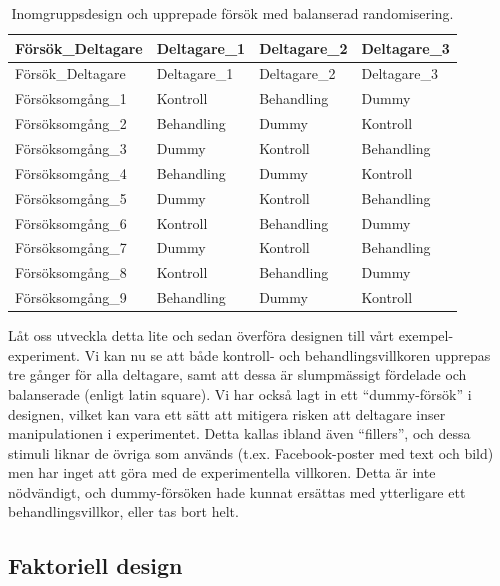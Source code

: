 \documentclass[
]{book}
\begin{document}
\begin{longtable}[]{@{}llll@{}}
\caption{\label{tab:tab-02-07-5-5-02}Inomgruppsdesign och upprepade försök med balanserad randomisering.}\tabularnewline
\toprule
Försök\_Deltagare & Deltagare\_1 & Deltagare\_2 & Deltagare\_3\tabularnewline
\midrule
\endfirsthead
\toprule
Försök\_Deltagare & Deltagare\_1 & Deltagare\_2 & Deltagare\_3\tabularnewline
\midrule
\endhead
Försöksomgång\_1 & Kontroll & Behandling & Dummy\tabularnewline
Försöksomgång\_2 & Behandling & Dummy & Kontroll\tabularnewline
Försöksomgång\_3 & Dummy & Kontroll & Behandling\tabularnewline
Försöksomgång\_4 & Behandling & Dummy & Kontroll\tabularnewline
Försöksomgång\_5 & Dummy & Kontroll & Behandling\tabularnewline
Försöksomgång\_6 & Kontroll & Behandling & Dummy\tabularnewline
Försöksomgång\_7 & Dummy & Kontroll & Behandling\tabularnewline
Försöksomgång\_8 & Kontroll & Behandling & Dummy\tabularnewline
Försöksomgång\_9 & Behandling & Dummy & Kontroll\tabularnewline
\bottomrule
\end{longtable}

Låt oss utveckla detta lite och sedan överföra designen till vårt exempel-experiment. Vi kan nu se att både kontroll- och behandlingsvillkoren upprepas tre gånger för alla deltagare, samt att dessa är slumpmässigt fördelade och balanserade (enligt latin square). Vi har också lagt in ett ``dummy-försök'' i designen, vilket kan vara ett sätt att mitigera risken att deltagare inser manipulationen i experimentet. Detta kallas ibland även ``fillers'', och dessa stimuli liknar de övriga som används (t.ex. Facebook-poster med text och bild) men har inget att göra med de experimentella villkoren. Detta är inte nödvändigt, och dummy-försöken hade kunnat ersättas med ytterligare ett behandlingsvillkor, eller tas bort helt.

\hypertarget{sub07.5.6}{%
\subsection{Faktoriell design}\label{sub07.5.6}}
\end{document}

